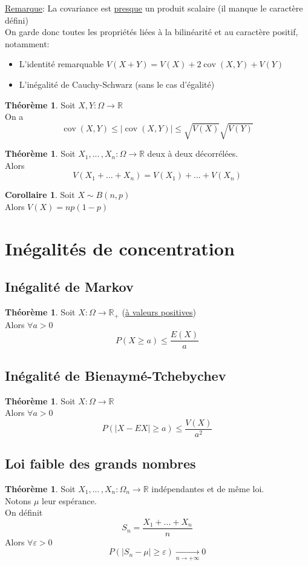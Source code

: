 \documentclass[10pt,a4paper]{article}
\theoremstyle{definition}
\newtheorem{theorem}[proposition]{Théorème}
\newtheorem{corollaire}[proposition]{Corollaire}
\DeclareMathOperator{\cov}{cov}
\begin{document}
\noindent \uline{Remarque}: La covariance est \uline{presque} un produit scalaire (il manque le caractère défini) \\
On garde donc toutes les propriétés liées à la bilinéarité et au caractère positif, notamment:
\begin{itemize}
\item L'identité remarquable $V(X + Y) = V(X) + 2\cov(X, Y) + V(Y)$
\item L'inégalité de Cauchy-Schwarz (sans le cas d'égalité)
\end{itemize}
\begin{theorem}
Soit $X, Y: \Omega \to \mathbb{R}$ \\
On a
\[ \cov(X, Y) \leq |\cov(X, Y)| \leq \sqrt{V(X)} \sqrt{V(Y)} \]
\end{theorem}
\begin{theorem}
Soit $X_1, ...\,, X_n: \Omega \to \mathbb{R}$ deux à deux décorrélées. \\
Alors 
\[ V(X_1 + ... + X_n) = V(X_1) + ... + V(X_n) \]
\end{theorem}
\begin{corollaire}
Soit $X \sim B(n, p)$ \\
Alors $V(X) = np(1-p)$
\end{corollaire}

\section{Inégalités de concentration}
\subsection{Inégalité de Markov}
\begin{theorem}
Soit $X: \Omega \to \mathbb{R}_+$ (\uline{à valeurs positives}) \\
Alors $\forall a > 0$
\[ P(X \geq a) \leq \frac{E(X)}{a} \]
\end{theorem}

\subsection{Inégalité de Bienaymé-Tchebychev}
\begin{theorem}
Soit $X: \Omega \to \mathbb{R}$ \\
Alors $\forall a > 0$
\[ P(|X - EX| \geq a) \leq \frac{V(X)}{a^2} \]
\end{theorem}

\subsection{Loi faible des grands nombres}
\begin{theorem}
Soit $X_1, ...\,, X_n: \Omega_n \to \mathbb{R}$ indépendantes et de même loi. \\
Notons $\mu$ leur espérance. \\
On définit 
\[S_n = \frac{X_1 + ... + X_n}{n}\]
Alors $\forall \varepsilon > 0$
\[ P(|S_n - \mu| \geq \varepsilon) \xrightarrow[n \to +\infty]{} 0 \]
\end{theorem}
\end{document}

